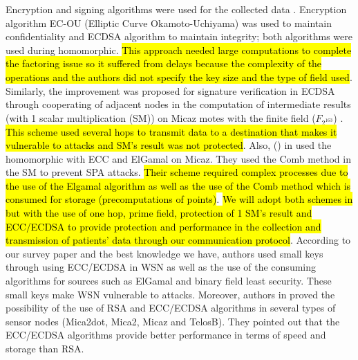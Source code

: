 \documentclass[a4paper,11pt]{article}
\DeclareRobustCommand{\hlyellow}[1]{{\sethlcolor{white}\hl{#1}}}
\begin{document}
Encryption and signing algorithms were used for the collected data \cite{p11,p15}. Encryption algorithm EC-OU (Elliptic Curve Okamoto-Uchiyama) was used to maintain confidentiality and ECDSA algorithm to maintain integrity; both algorithms were used during homomorphic. \hlyellow{This approach needed large computations to complete the factoring issue so it suffered from delays because the complexity of the operations and the authors did not specify the key size and the type of field used}. Similarly, the improvement was proposed for signature verification in ECDSA through cooperating of adjacent nodes in the computation of intermediate results (with 1 scalar multiplication (SM)) on Micaz motes with the finite field ($F_{2^{163}}$) \cite{p46,p17}. \hlyellow{This scheme used several hops to transmit data to a destination that makes it vulnerable to attacks and SM's result was not protected}. Also, \citeauthor{pr35}(\citeyear{pr35}) in \cite{pr35} used the homomorphic with ECC and ElGamal on Micaz. They used the Comb method in the SM to prevent SPA attacks. \hlyellow{Their scheme required complex processes due to the use of the Elgamal algorithm as well as the use of the Comb method which is consumed for storage (precomputations of points)}. \hlyellow{We will adopt both schemes in \cite{p17, pr35} but with the use of one hop, prime field, protection of 1 SM's result and ECC/ECDSA to provide protection and performance in the collection and transmission of patients' data through our communication protocol}. According to our survey paper \cite{p93} and the best knowledge we have, authors used small keys through using ECC/ECDSA in WSN as well as the use of the consuming algorithms for sources such as ElGamal and binary field least security. These small keys make WSN vulnerable to attacks. Moreover, authors in \cite{p9,p87,pr24} proved the possibility of the use of RSA and ECC/ECDSA algorithms in several types of sensor nodes (Mica2dot, Mica2, Micaz and TelosB). They pointed out that the ECC/ECDSA algorithms provide better performance in terms of speed and storage than RSA.
\end{document}

